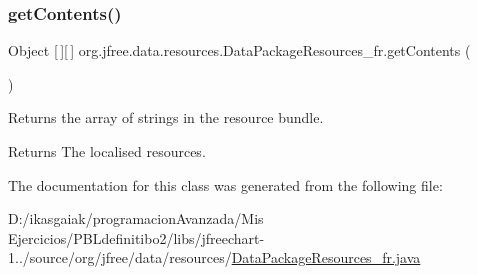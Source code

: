 \subsubsection{\texorpdfstring{get\+Contents()}{getContents()}}
{\footnotesize\ttfamily Object \mbox{[}$\,$\mbox{]}\mbox{[}$\,$\mbox{]} org.\+jfree.\+data.\+resources.\+Data\+Package\+Resources\+\_\+fr.\+get\+Contents (\begin{DoxyParamCaption}{ }\end{DoxyParamCaption})}

Returns the array of strings in the resource bundle.

\begin{DoxyReturn}{Returns}
The localised resources. 
\end{DoxyReturn}


The documentation for this class was generated from the following file\+:\begin{DoxyCompactItemize}
\item 
D\+:/ikasgaiak/programacion\+Avanzada/\+Mis Ejercicios/\+P\+B\+Ldefinitibo2/libs/jfreechart-\/1../source/org/jfree/data/resources/\mbox{\hyperlink{_data_package_resources__fr_8java}{Data\+Package\+Resources\+\_\+fr.\+java}}\end{DoxyCompactItemize}
